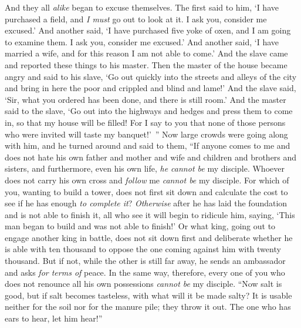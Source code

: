 \begin{biblechapter}
\verse And they all \textit{alike} began to excuse themselves. The first said to him, ‘I have purchased a field, and \textit{I must} go out to look at it. I ask you, consider me excused.’
\verse And another said, ‘I have purchased five yoke of oxen, and I am going to examine them. I ask you, consider me excused.’
\verse And another said, ‘I have married a wife, and for this reason I am not able to come.’
\verse And the slave came and reported these things to his master. Then the master of the house became angry and said to his slave, ‘Go out quickly into the streets and alleys of the city and bring in here the poor and crippled and blind and lame!’
\verse And the slave said, ‘Sir, what you ordered has been done, and there is still room.’
\verse And the master said to the slave, ‘Go out into the highways and hedges and press them to come in, so that my house will be filled!
\verse For I say to you that none of those persons who were invited will taste my banquet!’ ”
 Now large crowds were going along with him, and he turned around and said to them,
\verse “If anyone comes to me and does not hate his own father and mother and wife and children and brothers and sisters, and furthermore, even his own life, \textit{he cannot be} my disciple.
\verse Whoever does not carry his own cross and \textit{follow} me \textit{cannot be} my disciple.
\verse For which of you, wanting to build a tower, does not first sit down and calculate the cost to see if he has enough \textit{to complete it}?
\verse \textit{Otherwise} after he has laid the foundation and is not able to finish it, all who see it will begin to ridicule him,
\verse saying, ‘This man began to build and was not able to finish!’
\verse Or what king, going out to engage another king in battle, does not sit down first and deliberate whether he is able with ten thousand to oppose the one coming against him with twenty thousand.
\verse But if not, while the other is still far away, he sends an ambassador and asks \textit{for terms of} peace.
\verse In the same way, therefore, every one of you who does not renounce all his own possessions \textit{cannot be} my disciple.
\verse “Now salt is good, but if salt becomes tasteless, with what will it be made salty?
\verse It is usable neither for the soil nor for the manure pile; they throw it out. The one who has ears to hear, let him hear!”
\end{biblechapter}

